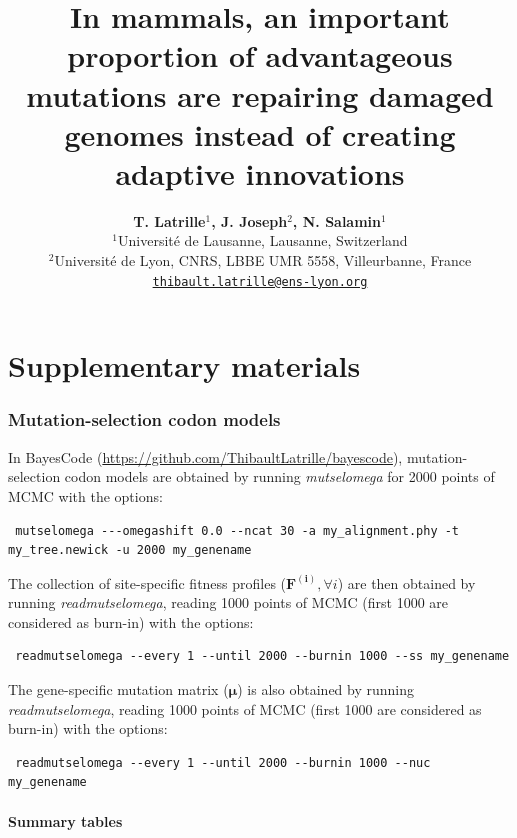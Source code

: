 \documentclass{article}
\title{In mammals, an important proportion of advantageous mutations are repairing damaged genomes instead of creating adaptive innovations}
\author{
    \large
    \textbf{T. {Latrille}$^{1}$, J. {Joseph}$^{2}$, N. {Salamin}$^{1}$}\\
    \normalsize $^{1}$Université de Lausanne, Lausanne, Switzerland\\
    \normalsize $^{2}$Université de Lyon, CNRS, LBBE UMR 5558, Villeurbanne, France \\
    \normalsize \texttt{\href{mailto:thibault.latrille@ens-lyon.org}{thibault.latrille@ens-lyon.org}} \\
}
\date{}
\newcommand{\UniDimArray}[1]{\bm{#1}}
\begin{document}
    \maketitle
    \part*{Supplementary materials}
    \tableofcontents
    \clearpage


    \section{Mutation-selection codon models}\label{sec:site-specific-mutation-selection-codon-models}
    In BayesCode (\url{https://github.com/ThibaultLatrille/bayescode}), mutation-selection codon models are obtained by running \textit{mutselomega} for 2000 points of MCMC with the options:
    \begin{scriptsize}
        \begin{verbatim}
 mutselomega ---omegashift 0.0 --ncat 30 -a my_alignment.phy -t my_tree.newick -u 2000 my_genename
        \end{verbatim}
    \end{scriptsize}
    The collection of site-specific fitness profiles ($\UniDimArray{F^{(i)}}, \forall i$) are then obtained by running \textit{readmutselomega}, reading 1000 points of MCMC (first 1000 are considered as burn-in) with the options:
    \begin{scriptsize}
        \begin{verbatim}
 readmutselomega --every 1 --until 2000 --burnin 1000 --ss my_genename
        \end{verbatim}
    \end{scriptsize}
    The gene-specific mutation matrix ($\UniDimArray{\mu}$) is also obtained by running \textit{readmutselomega}, reading 1000 points of MCMC (first 1000 are considered as burn-in) with the options:
    \begin{scriptsize}
        \begin{verbatim}
 readmutselomega --every 1 --until 2000 --burnin 1000 --nuc my_genename
        \end{verbatim}
    \end{scriptsize}

    \subsection{Summary tables}\label{subsec:summary-table-mutsel}
\end{document}

